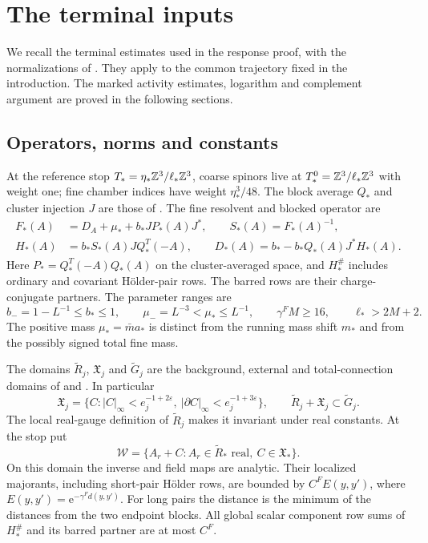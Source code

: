 \section{The terminal inputs}\label{sec:rrm-terminal-inputs}

We recall the terminal estimates used in the response proof, with the
normalizations of \cite[\S6 and Appendix~A]{TerminalPressure}.
They apply to the common trajectory fixed in the introduction.
The marked activity estimates, logarithm and complement argument
are proved in the following sections.

\subsection{Operators, norms and constants}
At the reference stop $T_* =\eta_*\mathbb Z^3/\ell_*\mathbb Z^3$,
coarse spinors live at $T_*^0=\mathbb Z^3/\ell_*\mathbb Z^3$ with weight one;
fine chamber indices have weight $\eta_*^3/48$.
The block average $Q_*$ and cluster injection $J$ are those of
\cite[\S2.1 and \S4.2]{FermionBlock}. The fine resolvent and blocked operator are
\begin{equation}\label{eq:interacting-terminal-operators}
 \begin{split}
 F_*(A)&=D_A+\mu_*+b_*JP_*(A)J^*,\qquad S_*(A)=F_*(A)^{-1},\\
 H_*(A)&=b_*S_*(A)JQ_*^T(-A),\qquad
 D_*(A)=b_*-b_*Q_*(A)J^*H_*(A).
 \end{split}
\end{equation}
Here $P_*=Q_*^T(-A)Q_*(A)$ on the cluster-averaged space,
and $H_*^\#$ includes ordinary and covariant H\"older-pair rows.
The barred rows are their charge-conjugate partners.
The parameter ranges are
\[
 b_-=1-L^{-1}\le b_*\le1,\qquad
 \mu_-=L^{-3}<\mu_*\le L^{-1},\qquad
 \gamma^FM\ge16,\qquad \ell_*>2M+2.
\]
The positive mass $\mu_*=\bar m a_*$ is distinct from the running
mass shift $m_*$ and from the possibly signed total fine mass.

The domains $\widetilde R_j$, $\mathfrak X_j$ and
$\widetilde G_j$ are the background, external and total-connection
domains of \cite[\S6]{MaxwellBlock} and \cite[\S2.3]{NormalizedContraction}.
In particular
\[
 \mathfrak X_j=\{C:|C|_\infty<e_j^{-1+2\varepsilon},\
                   |\partial C|_\infty<e_j^{-1+3\varepsilon}\},
 \qquad \widetilde R_j+\mathfrak X_j\subset\widetilde G_j.
\]
The local real-gauge definition of $\widetilde R_j$ makes it invariant
under real constants. At the stop put
\[
 \mathcal W=\{A_r+C:A_r\in\widetilde R_*\text{ real},\
                  C\in\mathfrak X_*\}.
\]
On this domain the inverse and field maps are analytic. Their
localized majorants, including short-pair H\"older rows, are bounded
by $C^F E(y,y')$, where $E(y,y')=\mathrm e^{-\gamma^Fd(y,y')}$.
For long pairs the distance is the minimum of the distances from
the two endpoint blocks. All global scalar component row sums of
$H_*^\#$ and its barred partner are at most $C^F$.

